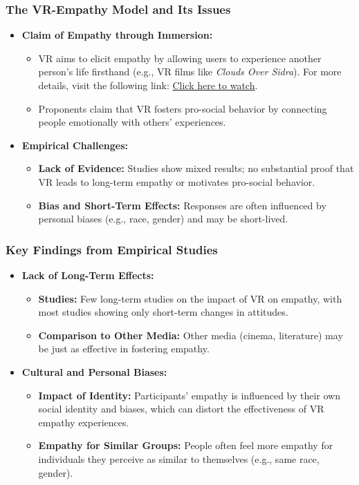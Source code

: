 \documentclass[aspectratio=169,xcolor=dvipsnames]{beamer}
\begin{document}
\begin{frame}
\frametitle{The VR-Empathy Model and Its Issues}
\begin{itemize}
    \item \textbf{Claim of Empathy through Immersion:}
    \begin{itemize}
          \item VR aims to elicit empathy by allowing users to experience another person’s life firsthand (e.g., VR films like \textit{Clouds Over Sidra}). For more details, visit the following link: \href{https://v.qq.com/x/page/d03194nt7hs.html}{Click here to watch}.

        \item Proponents claim that VR fosters pro-social behavior by connecting people emotionally with others' experiences.
    \end{itemize}
    \item \textbf{Empirical Challenges:}
    \begin{itemize}
        \item \textbf{Lack of Evidence:} Studies show mixed results; no substantial proof that VR leads to long-term empathy or motivates pro-social behavior.
        \item \textbf{Bias and Short-Term Effects:} Responses are often influenced by personal biases (e.g., race, gender) and may be short-lived.
    \end{itemize}
\end{itemize}
\end{frame}

\begin{frame}
\frametitle{Key Findings from Empirical Studies}
\begin{itemize}
    \item \textbf{Lack of Long-Term Effects:}
    \begin{itemize}
        \item \textbf{Studies:} Few long-term studies on the impact of VR on empathy, with most studies showing only short-term changes in attitudes.
        \item \textbf{Comparison to Other Media:} Other media (cinema, literature) may be just as effective in fostering empathy.
    \end{itemize}
    \item \textbf{Cultural and Personal Biases:}
    \begin{itemize}
        \item \textbf{Impact of Identity:} Participants’ empathy is influenced by their own social identity and biases, which can distort the effectiveness of VR empathy experiences.
        \item \textbf{Empathy for Similar Groups:} People often feel more empathy for individuals they perceive as similar to themselves (e.g., same race, gender).
    \end{itemize}
\end{itemize}
\end{frame}
\end{document}
